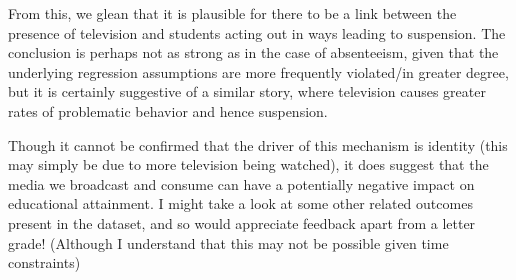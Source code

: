 \documentclass{article}
\begin{document}

\clearpage

From this, we glean that it is plausible for there to be a link between the presence of television and students acting out in ways leading to suspension. The conclusion is perhaps not as strong as in the case of absenteeism, given that the underlying regression assumptions are more frequently violated/in greater degree, but it is certainly suggestive of a similar story, where television causes greater rates of problematic behavior and hence suspension.

Though it cannot be confirmed that the driver of this mechanism is identity (this may simply be due to more television being watched), it does suggest that the media we broadcast and consume can have a potentially negative impact on educational attainment. I might take a look at some other related outcomes present in the dataset, and so would appreciate feedback apart from a letter grade! (Although I understand that this may not be possible given time constraints)

%

%
\end{document}
